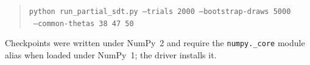 \documentclass[11pt]{article}
\begin{document}
\begin{quote}\small
\texttt{python run\_partial\_sdt.py --trials 2000 --bootstrap-draws 5000}\\
\texttt{\phantom{python run\_partial\_sdt.py} --common-thetas 38 47 50}
\end{quote}

\noindent Checkpoints were written under NumPy~2 and require the
\texttt{numpy.\_core} module alias when loaded under NumPy~1; the driver installs it.
\end{document}
